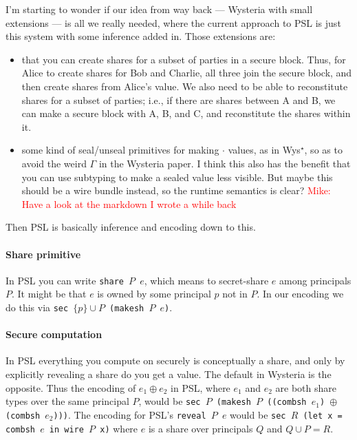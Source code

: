\documentclass[10pt]{article}
\newcommand{\ssec}{\ensuremath{\mathtt{\cdot}}}
\newcommand{\mwh}[1]{\textcolor{red}{Mike: #1}}
\begin{document}
I'm starting to wonder if our idea from way back --- Wysteria with
small extensions --- is all we really needed, where the current approach
to PSL is just this system with some inference added in. Those
extensions are:
\begin{itemize}
\item that you can create shares for a subset of parties in a secure
  block. Thus, for Alice to create shares for Bob and Charlie, all
  three join the secure block, and then create shares from Alice's
  value. We also need to be able to reconstitute shares for a subset
  of parties; i.e., if there are shares between A and B, we can make a
  secure block with A, B, and C, and reconstitute the shares within
  it. 
\item some kind of seal/unseal primitives for making $\ssec$ values, as
in Wys$^\star$, so as to avoid the weird $\Gamma$ in the Wysteria
paper. I think this also has the benefit that you can use subtyping to
make a sealed value less visible. But maybe this should be a wire
bundle instead, so the runtime semantics is clear?
\mwh{Have a look at the markdown I wrote a while back}
\end{itemize}

Then PSL is basically inference and encoding down to this.

\paragraph{Share primitive} In PSL you can write \texttt{share $P$
  $e$}, which means to secret-share $e$ among principals $P$. It might
be that $e$ is owned by some principal $p$ not in $P$. In our encoding
we do this via \texttt{sec $\{p\}\cup{P}$ (makesh $P$ $e$)}.

\paragraph{Secure computation} In PSL everything you compute on
securely is conceptually a share, and only by explicitly revealing a
share do you get a value. The default in Wysteria is the
opposite. Thus the encoding of $e_1 \oplus e_2$ in PSL, where $e_1$
and $e_2$ are both share types over the same principal $P$, would be
\texttt{sec $P$ (makesh $P$ ((combsh $e_1$) $\oplus$ (combsh
  $e_2$)))}. The encoding for PSL's \texttt{reveal $P$ $e$} would be
\texttt{sec $R$ (let x = combsh $e$ in wire $P$ x)} where $e$ is
a share over principals $Q$ and $Q \cup P = R$. 
\end{document}
